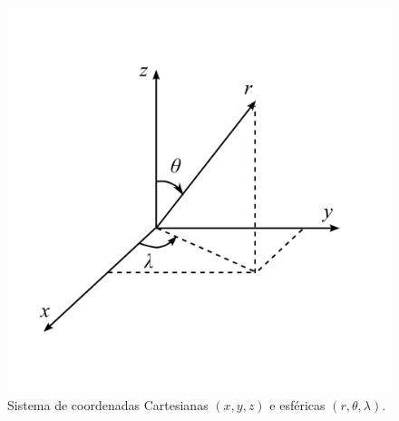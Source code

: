 \documentclass[10pt,a4paper,fleqn]{article}
\begin{document}
\begin{figure}[h]
    \centering
    \includegraphics[scale=1]{Figs/Fig2.png}
    \caption{Sistema de coordenadas Cartesianas $(x,y,z)$ e esf\'{e}ricas $(r,\theta,\lambda)$.}
    \label{fig:fig2}
\end{figure}

\medskip
\end{document}
